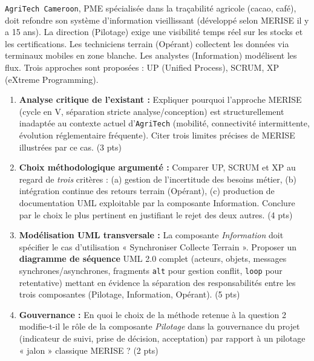 \documentclass[11pt]{article}
\begin{document}
\begin{exercice}
\texttt{AgriTech Cameroon}, PME spécialisée dans la traçabilité agricole (cacao, café), doit refondre son système d'information vieillissant (développé selon MERISE il y a 15 ans). La direction (Pilotage) exige une visibilité temps réel sur les stocks et les certifications. Les techniciens terrain (Opérant) collectent les données via terminaux mobiles en zone blanche. Les analystes (Information) modélisent les flux. Trois approches sont proposées : UP (Unified Process), SCRUM, XP (eXtreme Programming).
\begin{enumerate}
    \item \textbf{Analyse critique de l'existant :} Expliquer pourquoi l'approche MERISE (cycle en V, séparation stricte analyse/conception) est structurellement inadaptée au contexte actuel d'\texttt{AgriTech} (mobilité, connectivité intermittente, évolution réglementaire fréquente). Citer trois limites précises de MERISE illustrées par ce cas. (3 pts)
    \item \textbf{Choix méthodologique argumenté :} Comparer UP, SCRUM et XP au regard de \textit{trois} critères : (a) gestion de l'incertitude des besoins métier, (b) intégration continue des retours terrain (Opérant), (c) production de documentation UML exploitable par la composante Information. Conclure par le choix le plus pertinent en justifiant le rejet des deux autres. (4 pts)
    \item \textbf{Modélisation UML transversale :} La composante \textit{Information} doit spécifier le cas d'utilisation « Synchroniser Collecte Terrain ». Proposer un \textbf{diagramme de séquence} UML 2.0 complet (acteurs, objets, messages synchrones/asynchrones, fragments \texttt{alt} pour gestion conflit, \texttt{loop} pour retentative) mettant en évidence la séparation des responsabilités entre les trois composantes (Pilotage, Information, Opérant). (5 pts)
    \item \textbf{Gouvernance :} En quoi le choix de la méthode retenue à la question 2 modifie-t-il le rôle de la composante \textit{Pilotage} dans la gouvernance du projet (indicateur de suivi, prise de décision, acceptation) par rapport à un pilotage « jalon » classique MERISE ? (2 pts)
\end{enumerate}
\end{exercice}
\end{document}
